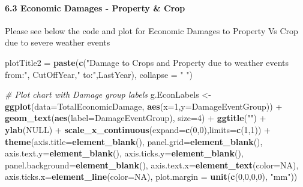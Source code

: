 \documentclass[]{article}
\newenvironment{Shaded}{\begin{snugshade}}{\end{snugshade}}
\newcommand{\KeywordTok}[1]{\textcolor[rgb]{0.13,0.29,0.53}{\textbf{{#1}}}}
\newcommand{\DataTypeTok}[1]{\textcolor[rgb]{0.13,0.29,0.53}{{#1}}}
\newcommand{\DecValTok}[1]{\textcolor[rgb]{0.00,0.00,0.81}{{#1}}}
\newcommand{\StringTok}[1]{\textcolor[rgb]{0.31,0.60,0.02}{{#1}}}
\newcommand{\CommentTok}[1]{\textcolor[rgb]{0.56,0.35,0.01}{\textit{{#1}}}}
\newcommand{\OtherTok}[1]{\textcolor[rgb]{0.56,0.35,0.01}{{#1}}}
\newcommand{\NormalTok}[1]{{#1}}
\let\oldparagraph\paragraph
\renewcommand{\paragraph}[1]{\oldparagraph{#1}\mbox{}}
\begin{document}
\paragraph{6.3 Economic Damages - Property \&
Crop}\label{economic-damages---property-crop}

Please see below the code and plot for Economic Damages to Property Vs
Crop due to severe weather events

\begin{Shaded}
\begin{Highlighting}[]
\NormalTok{plotTitle2 =}\StringTok{ }\KeywordTok{paste}\NormalTok{(}\KeywordTok{c}\NormalTok{(}\StringTok{"Damage to Crops and Property due to weather events from:"}\NormalTok{,}
                     \NormalTok{CutOffYear,}\StringTok{" to:"}\NormalTok{,LastYear), }
                   \DataTypeTok{collapse =} \StringTok{" "}\NormalTok{)}

\CommentTok{# Plot chart with Damage group labels  }
\NormalTok{g.EconLabels <-}\StringTok{ }\KeywordTok{ggplot}\NormalTok{(}\DataTypeTok{data=}\NormalTok{TotalEconomicDamage, }
                       \KeywordTok{aes}\NormalTok{(}\DataTypeTok{x=}\DecValTok{1}\NormalTok{,}\DataTypeTok{y=}\NormalTok{DamageEventGroup)) +}
\StringTok{     }\KeywordTok{geom_text}\NormalTok{(}\KeywordTok{aes}\NormalTok{(}\DataTypeTok{label=}\NormalTok{DamageEventGroup), }\DataTypeTok{size=}\DecValTok{4}\NormalTok{) +}
\StringTok{     }\KeywordTok{ggtitle}\NormalTok{(}\StringTok{""}\NormalTok{) +}
\StringTok{     }\KeywordTok{ylab}\NormalTok{(}\OtherTok{NULL}\NormalTok{) +}
\StringTok{     }\KeywordTok{scale_x_continuous}\NormalTok{(}\DataTypeTok{expand=}\KeywordTok{c}\NormalTok{(}\DecValTok{0}\NormalTok{,}\DecValTok{0}\NormalTok{),}\DataTypeTok{limits=}\KeywordTok{c}\NormalTok{(}\DecValTok{1}\NormalTok{,}\DecValTok{1}\NormalTok{)) +}
\StringTok{     }\KeywordTok{theme}\NormalTok{(}\DataTypeTok{axis.title=}\KeywordTok{element_blank}\NormalTok{(),}
           \DataTypeTok{panel.grid=}\KeywordTok{element_blank}\NormalTok{(),}
           \DataTypeTok{axis.text.y=}\KeywordTok{element_blank}\NormalTok{(),}
           \DataTypeTok{axis.ticks.y=}\KeywordTok{element_blank}\NormalTok{(),}
           \DataTypeTok{panel.background=}\KeywordTok{element_blank}\NormalTok{(),}
           \DataTypeTok{axis.text.x=}\KeywordTok{element_text}\NormalTok{(}\DataTypeTok{color=}\OtherTok{NA}\NormalTok{),}
           \DataTypeTok{axis.ticks.x=}\KeywordTok{element_line}\NormalTok{(}\DataTypeTok{color=}\OtherTok{NA}\NormalTok{),}
           \DataTypeTok{plot.margin =} \KeywordTok{unit}\NormalTok{(}\KeywordTok{c}\NormalTok{(}\DecValTok{0}\NormalTok{,}\DecValTok{0}\NormalTok{,}\DecValTok{0}\NormalTok{,}\DecValTok{0}\NormalTok{), }\StringTok{"mm"}\NormalTok{))}


\end{Highlighting}
\end{Shaded}
\end{document}
